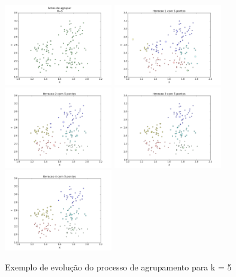 \documentclass[12pt, a4paper]{article}
\begin{document}
\begin{landscape}
\begin{figure}[!ht]
\label{k=5}
  \caption{Exemplo de evolução do processo de agrupamento para k = 5}
  \centering
    \includegraphics[width=0.42\textwidth]{antes_k5.png}
    \includegraphics[width=0.42\textwidth]{depois_1.png}
    \includegraphics[width=0.42\textwidth]{depois_2.png}
    \includegraphics[width=0.42\textwidth]{depois_3.png}
    \includegraphics[width=0.42\textwidth]{depois_4.png}

\end{figure}
\end{landscape}
\end{document}
